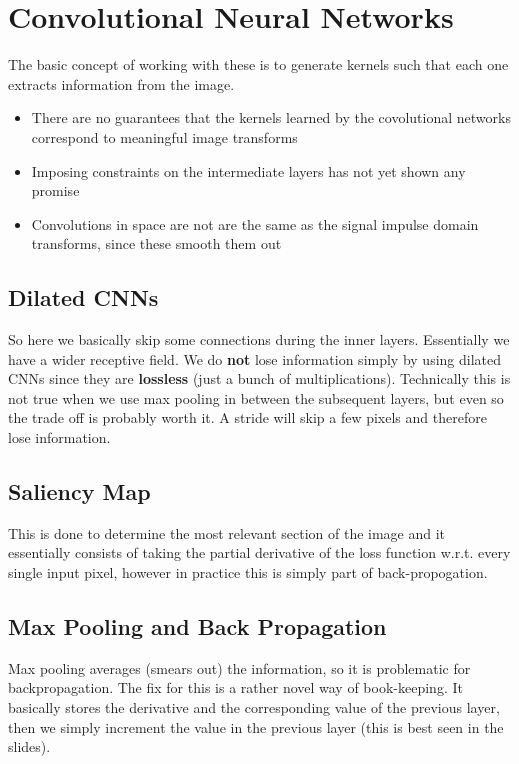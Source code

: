 \documentclass[12pt,a4paper,oneside,headinclude]{scrartcl}
\numberwithin{figure}{section}
\numberwithin{equation}{section}
\numberwithin{table}{section}
\begin{document}
\section{Convolutional Neural Networks}
\label{sec:orgc44b8b9}
The basic concept of working with these is to generate kernels such that each
one extracts information from the image.

\begin{itemize}
\item There are no guarantees that the kernels learned by the covolutional networks
correspond to meaningful image transforms
\item Imposing constraints on the intermediate layers has not yet shown any promise
\item Convolutions in space are not are the same as the signal impulse domain
transforms, since these smooth them out
\end{itemize}
\subsection{Dilated CNNs}
\label{sec:orgfe4e0c6}
So here we basically skip some connections during the inner layers. Essentially
we have a wider receptive field. We do \textbf{not} lose information simply by using
dilated CNNs since they are \textbf{lossless} (just a bunch of multiplications).
Technically this is not true when we use max pooling in between the subsequent
layers, but even so the trade off is probably worth it. A stride will skip a few
pixels and therefore lose information.
\subsection{Saliency Map}
\label{sec:org570adbf}
This is done to determine the most relevant section of the image and it
essentially consists of taking the partial derivative of the loss function
w.r.t. every single input pixel, however in practice this is simply part of
back-propogation.
\subsection{Max Pooling and Back Propagation}
\label{sec:org02e7244}
Max pooling averages (smears out) the information, so it is problematic for
backpropagation. The fix for this is a rather novel way of book-keeping. It
basically stores the derivative and the corresponding value of the previous
layer, then we simply increment the value in the previous layer (this is best
seen in the slides).
\end{document}
